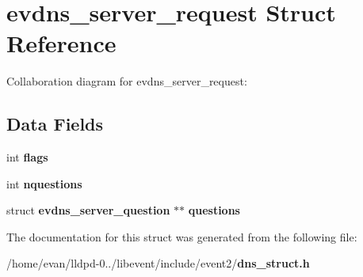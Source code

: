 \section{evdns\-\_\-server\-\_\-request \-Struct \-Reference}
\label{structevdns__server__request}


\-Collaboration diagram for evdns\-\_\-server\-\_\-request\-:
\subsection*{\-Data \-Fields}
\begin{DoxyCompactItemize}
\item 
int {\bfseries flags}\label{structevdns__server__request_ac8bf36fe0577cba66bccda3a6f7e80a4}

\item 
int {\bfseries nquestions}\label{structevdns__server__request_acda66c68463adef57b41d2f40e2bdd22}

\item 
struct {\bf evdns\-\_\-server\-\_\-question} $\ast$$\ast$ {\bfseries questions}\label{structevdns__server__request_aa436d52ecc22a417d5a2e4612462f66f}

\end{DoxyCompactItemize}


\-The documentation for this struct was generated from the following file\-:\begin{DoxyCompactItemize}
\item 
/home/evan/lldpd-\/0../libevent/include/event2/{\bf dns\-\_\-struct.\-h}\end{DoxyCompactItemize}
